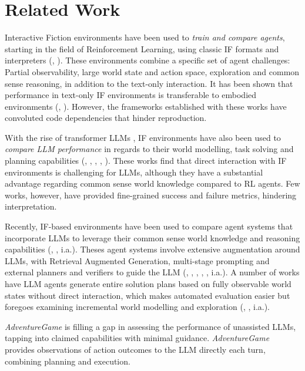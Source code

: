 \section{Related Work}
Interactive Fiction environments have been used to \textit{train and compare agents}, starting in the field of Reinforcement Learning, using classic IF formats and interpreters (\citet{textworld}, \citet{hausknecht2020interactive}). These environments combine a specific set of agent challenges: Partial observability, large world state and action space, exploration and common sense reasoning, in addition to the text-only interaction. It has been shown that performance in text-only IF environments is transferable to embodied environments (\citet{alfworld}, \citet{jansen2021systematic}). However, the frameworks established with these works have convoluted code dependencies that hinder reproduction.

With the rise of transformer LLMs \cite{NIPS2017_3f5ee243}, IF environments have also been used to \textit{compare LLM performance} in regards to their world modelling, task solving and planning capabilities (\citet{wang2022scienceworld}, \citet{tan2023text}, \citet{tsai2023can}, \citet{ma2024agentboard}, \citet{gioacchini2024agentquest}). These works find that direct interaction with IF environments is challenging for LLMs, although they have a substantial advantage regarding common sense world knowledge compared to RL agents. Few works, however, %
have provided fine-grained success and failure metrics, hindering interpretation.

Recently, IF-based environments have been used to compare agent systems that incorporate LLMs to leverage their common sense world knowledge and reasoning capabilities (\citet{wang2022scienceworld}, \citet{basavatia2024starlingselfsupervisedtrainingtextbased}, i.a.). Theses agent systems involve extensive augmentation around LLMs, with Retrieval Augmented Generation, multi-stage prompting and external planners and verifiers to guide the LLM (\citet{park2023generative}, \citet{llm2023planninginvestigation}, \citet{tikhonov2024plugh}, \citet{jansen2024discoveryworldvirtualenvironmentdeveloping}, \citet{li2025embodiedagentinterfacebenchmarking}, i.a.). A number of works have LLM agents generate entire solution plans based on fully observable world states without direct interaction, which makes automated evaluation easier but foregoes examining incremental world modelling and exploration (\citet{xie2023translating}, \citet{silver2022pddl}, i.a.).

\textit{AdventureGame} is filling a gap in assessing the performance of unassisted LLMs, tapping into claimed capabilities with minimal guidance. \textit{AdventureGame} provides observations of action outcomes to the LLM directly each turn, combining planning and execution.